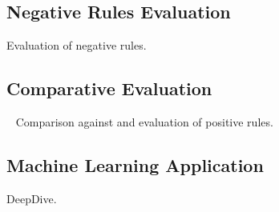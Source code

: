 \subsection{Negative Rules Evaluation}
Evaluation of negative rules.

\subsection{Comparative Evaluation} ~\label{sec:comp_evaluation}
Comparison against \amie and evaluation of positive rules.

\subsection{Machine Learning Application}
DeepDive.